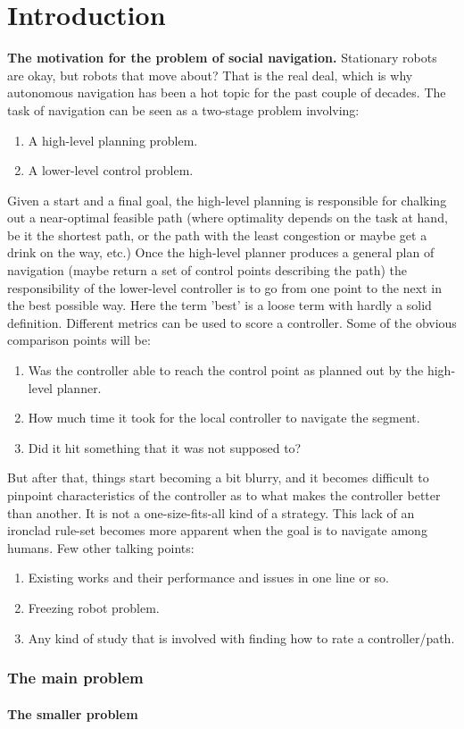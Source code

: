 \part{\rm\bfseries Introduction}
\label{ch:introduction}
\textbf{The motivation for the problem of social navigation.}
Stationary robots are okay, but robots that move about? That is the real deal, which is why autonomous navigation has been a hot topic for the past couple of decades. The task of navigation can be seen as a two-stage problem involving:
\begin{enumerate}
    \item A high-level planning problem.
    \item A lower-level control problem.
\end{enumerate}
Given a start and a final goal, the high-level planning is responsible for chalking out a near-optimal feasible path (where optimality depends on the task at hand, be it the shortest path, or the path with the least congestion or maybe get a drink on the way, etc.) Once the high-level planner produces a general plan of navigation (maybe return a set of control points describing the path) the responsibility of the lower-level controller is to go from one point to the next in the best possible way.
Here the term 'best' is a loose term with hardly a solid definition. Different metrics can be used to score a controller. Some of the obvious comparison points will be:
\begin{enumerate}
	\item Was the controller able to reach the control point as planned out by the high-level planner.
	\item How much time it took for the local controller to navigate the segment.
	\item Did it hit something that it was not supposed to?
\end{enumerate}
But after that, things start becoming a bit blurry, and it becomes difficult to pinpoint characteristics of the controller as to what makes the controller better than another. It is not a one-size-fits-all kind of a strategy. This lack of an ironclad rule-set becomes more apparent when the goal is to navigate among humans.
Few other talking points:
\begin{enumerate}
	\item Existing works and their performance and issues in one line or so.
	\item Freezing robot problem.
	\item Any kind of study that is involved with finding how to rate a controller/path. 
\end{enumerate}
\section{The main problem}
\subsection{The smaller problem}

